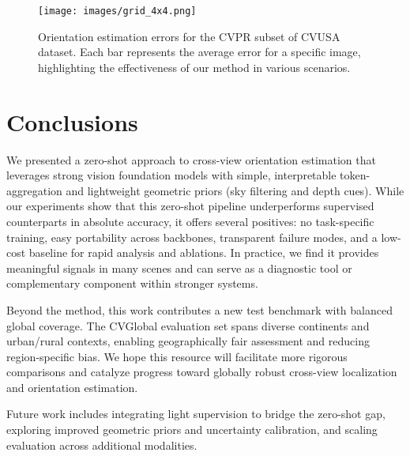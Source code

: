 \documentclass{bmvc2k}
\begin{document}
\begin{figure}[H]
    \centering
    \texttt{[image: images/grid\_4x4.png]}
    \caption{Orientation estimation errors for the CVPR subset of CVUSA dataset. Each bar represents the average error for a specific image, highlighting the effectiveness of our method in various scenarios.}
    \label{fig:orientation_errors}
\end{figure}



\section{Conclusions}
\label{sec:conclusions}

We presented a zero-shot approach to cross-view orientation estimation that leverages strong vision foundation models with simple, interpretable token-aggregation and lightweight geometric priors (sky filtering and depth cues). While our experiments show that this zero-shot pipeline underperforms supervised counterparts in absolute accuracy, it offers several positives: no task-specific training, easy portability across backbones, transparent failure modes, and a low-cost baseline for rapid analysis and ablations. In practice, we find it provides meaningful signals in many scenes and can serve as a diagnostic tool or complementary component within stronger systems.

Beyond the method, this work contributes a new test benchmark with balanced global coverage. The CVGlobal evaluation set spans diverse continents and urban/rural contexts, enabling geographically fair assessment and reducing region-specific bias. We hope this resource will facilitate more rigorous comparisons and catalyze progress toward globally robust cross-view localization and orientation estimation.

Future work includes integrating light supervision to bridge the zero-shot gap, exploring improved geometric priors and uncertainty calibration, and scaling evaluation across additional modalities.


\end{document}
